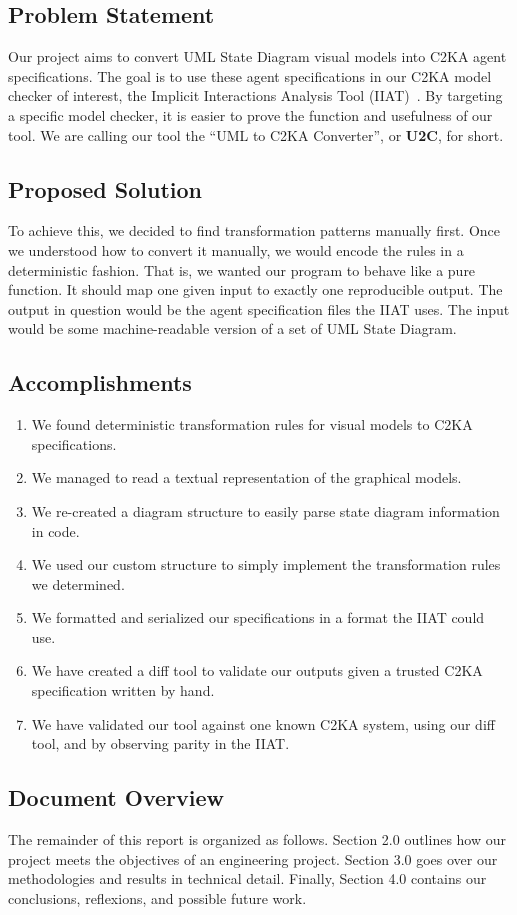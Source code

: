 \subsection{Problem Statement}\label{subsec:problem-statement}
Our project aims to convert UML State Diagram visual models into C2KA agent specifications.
The goal is to use these agent specifications in our C2KA model checker of interest,
the Implicit Interactions Analysis Tool (IIAT)~\cite{repo_iiat}.
By targeting a specific model checker, it is easier to prove the function and usefulness of our tool.
We are calling our tool the ``UML to C2KA Converter'', or \textbf{U2C}, for short.

\subsection{Proposed Solution}\label{subsec:proposed-solution}
To achieve this, we decided to find transformation patterns manually first.
Once we understood how to convert it manually, we would encode the rules in a deterministic fashion.
That is, we wanted our program to behave like a pure function.
It should map one given input to exactly one reproducible output.
The output in question would be the agent specification files the IIAT uses.
The input would be some machine-readable version of a set of UML State Diagram.

\subsection{Accomplishments}\label{subsec:accomplishments}
\begin{enumerate}
    \item We found deterministic transformation rules for visual models
    to C2KA specifications.
    \item We managed to read a textual representation of the graphical models.
    \item We re-created a diagram structure to easily parse state diagram information in code.
    \item We used our custom structure to simply implement the transformation rules we determined.
    \item We formatted and serialized our specifications in a format the IIAT could use.
    \item We have created a diff tool to validate our outputs given a trusted C2KA specification written by hand.
    \item We have validated our tool against one known C2KA system,
    using our diff tool, and by observing parity in the IIAT\@.
\end{enumerate}

\subsection{Document Overview}\label{subsec:document-overview}
The remainder of this report is organized as follows.
Section 2.0 outlines how our project meets the objectives of an engineering project.
Section 3.0 goes over our methodologies and results in technical detail.
Finally, Section 4.0 contains our conclusions, reflexions, and possible future work.
